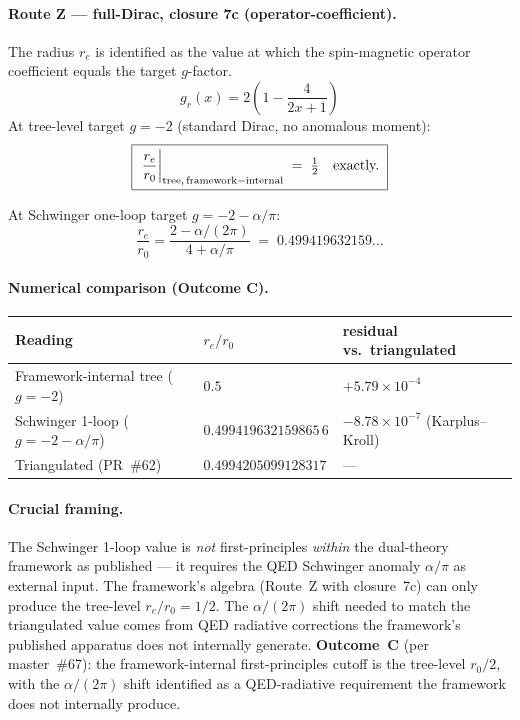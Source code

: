 \paragraph{Route Z --- full-Dirac, closure 7c (operator-coefficient).}
The radius $r_e$ is identified as the value at which the spin-magnetic
operator coefficient equals the target $g$-factor.
\[
g_r(x) = 2\!\left(1 - \frac{4}{2x+1}\right)
\]
At tree-level target $g = -2$ (standard Dirac, no anomalous moment):
\[
\boxed{\;
  \left.\frac{r_e}{r_0}\right|_{\rm tree,\,framework-internal}
  \;=\; \tfrac{1}{2} \quad\text{exactly.}
\;}
\]

At Schwinger one-loop target $g = -2 - \alpha/\pi$:
\[
\frac{r_e}{r_0} = \frac{2 - \alpha/(2\pi)}{4 + \alpha/\pi}
\;=\; 0.499419632159\dots
\]

\paragraph{Numerical comparison (Outcome C).}
\begin{center}
\begin{tabular}{lll}
\toprule
Reading                                & $r_e/r_0$              & residual vs.~triangulated \\
\midrule
Framework-internal tree ($g = -2$)     & $0.5$                  & $+5.79\times 10^{-4}$ \\
Schwinger 1-loop ($g = -2 - \alpha/\pi$)& $0.499419632159865\,6$ & $-8.78\times 10^{-7}$ (Karplus--Kroll) \\
Triangulated (PR~\#62)                 & $0.4994205099128317$   & --- \\
\bottomrule
\end{tabular}
\end{center}

\paragraph{Crucial framing.}
The Schwinger 1-loop value is \emph{not} first-principles \emph{within} the
dual-theory framework as published --- it requires the QED Schwinger anomaly
$\alpha/\pi$ as external input. The framework's algebra (Route~Z with
closure~7c) can only produce the tree-level $r_e/r_0 = 1/2$. The
$\alpha/(2\pi)$ shift needed to match the triangulated value comes from QED
radiative corrections the framework's published apparatus does not internally
generate. \textbf{Outcome~C} (per master~\#67): the framework-internal
first-principles cutoff is the tree-level $r_0/2$, with the $\alpha/(2\pi)$
shift identified as a QED-radiative requirement the framework does not
internally produce.

